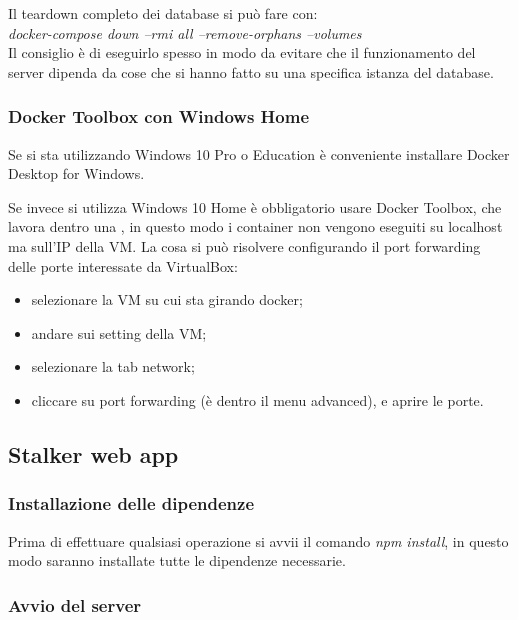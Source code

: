 \documentclass[../manuale-sviluppatore.tex]{subfiles}
\begin{document}
Il teardown completo dei database si può fare con:\\

\emph{docker-compose down --rmi all --remove-orphans --volumes}\\

Il consiglio è di eseguirlo spesso in modo da evitare che il funzionamento del server dipenda da cose che si hanno fatto su una specifica istanza del database.

\subsubsection{Docker Toolbox con Windows Home}

Se si sta utilizzando Windows 10 Pro o Education è conveniente installare Docker Desktop for Windows.

Se invece si utilizza Windows 10 Home è obbligatorio usare Docker Toolbox, che lavora dentro una , 
in questo modo i container non vengono eseguiti su localhost ma sull'IP della VM.%
La cosa si può risolvere configurando il port forwarding delle porte interessate da VirtualBox:

\begin{itemize}
\item selezionare la VM su cui sta girando docker;
\item andare sui setting della VM;%
\item selezionare la tab network;
\item cliccare su port forwarding (è dentro il menu advanced), e aprire le porte.
\end{itemize}

\subsection{Stalker web app}

\subsubsection{Installazione delle dipendenze}

Prima di effettuare qualsiasi operazione si avvii il comando \emph{npm install}, in questo modo saranno installate tutte le dipendenze necessarie.\\

\subsubsection{Avvio del server}
\end{document}
